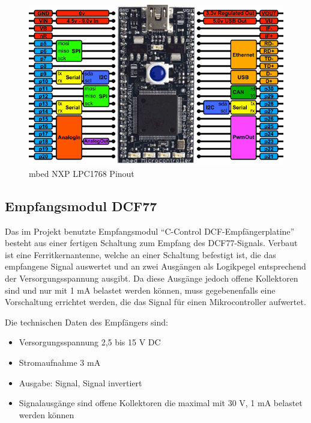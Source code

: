 			\begin{figure}[H]
				\centering
				\includegraphics[width=0.7\linewidth]{Grafiken/LPC1768-pinout}
				\caption[mbed NXP LPC1768 Pinout]{mbed NXP LPC1768 Pinout\protect\footnotemark}
				\label{fig:LPC1768-pinout}
			\end{figure}
			
			\cite{LPC1768}
		\subsection{Empfangsmodul DCF77}
			Das im Projekt benutzte Empfangsmodul \enquote{C-Control DCF-Empfängerplatine} besteht aus einer fertigen Schaltung zum Empfang des DCF77-Signals. Verbaut ist eine Ferritkernantenne, welche an einer Schaltung befestigt ist, die das empfangene Signal auswertet und an zwei Ausgängen als Logikpegel entsprechend der Versorgungsspannung ausgibt. Da diese Ausgänge jedoch offene Kollektoren sind und nur mit 1 mA belastet werden können, muss gegebenenfalls eine Vorschaltung errichtet werden, die das Signal für einen Mikrocontroller aufwertet.
			
			\newpage
			Die technischen Daten des Empfängers sind:
			
			\begin{itemize}
			 \item Versorgungsspannung 2,5 bis 15 V DC
			 \item Stromaufnahme 3 mA
			 \item Ausgabe: Signal, Signal invertiert
			 \item Signalausgänge sind offene Kollektoren die maximal mit 30 V, 1 mA belastet werden können
			\end{itemize}
			
